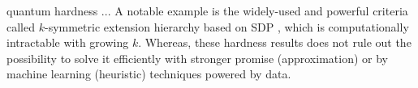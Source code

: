 \documentclass[
aps,
pra,
twocolumn,
floatfix,
]{revtex4-2}
\theoremstyle{plain}
\newtheorem{theorem}{Theorem}
\theoremstyle{definition}
\newcommand{\locc}{\textup{LOCC}}
\begin{document}
quantum hardness ... \cite{gutoskiQuantumInteractiveProofs2015}
A notable example is the widely-used and powerful criteria called $k$-symmetric extension hierarchy based on SDP \cite{navascuesPowerSymmetricExtensions2009}, 
which is computationally intractable with growing $k$.
Whereas, these hardness results does not rule out the possibility to solve it efficiently with stronger promise (approximation) or by machine learning (heuristic) techniques powered by data.
\end{document}

